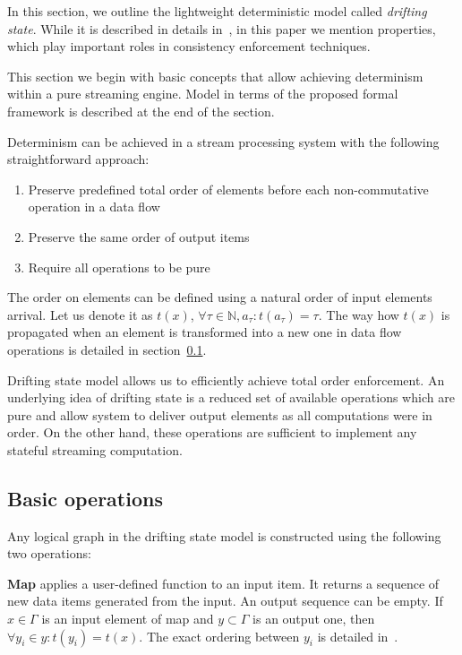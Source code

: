 
\label {fs-model-section}

In this section, we outline the lightweight deterministic model called {\em drifting state}. While it is described in details in~\cite{we2018adbis}, in this paper we mention properties, which play important roles in consistency enforcement techniques.

This section we begin with basic concepts that allow achieving determinism within a pure streaming engine. Model in terms of the proposed formal framework is described at the end of the section.

Determinism can be achieved in a stream processing system with the following straightforward approach:
\begin{enumerate}
    \item Preserve predefined total order of elements before each non-commutative operation in a data flow
    \item Preserve the same order of output items
    \item Require all operations to be pure
\end{enumerate}

The order on elements can be defined using a natural order of input elements arrival. Let us denote it as $t(x)$, $\forall \tau \in \mathbb{N}, a_\tau :  t(a_\tau)=\tau$. The way how $t(x)$ is propagated when an element is transformed into a new one in data flow operations is detailed in section~\ref{ops}.

Drifting state model allows us to efficiently achieve total order enforcement. An underlying idea of drifting state is a reduced set of available operations which are pure and allow system to deliver output elements as all computations were in order. On the other hand, these operations are sufficient to implement any stateful streaming computation.

\subsection{Basic operations}
\label{ops}

Any logical graph in the drifting state model is constructed using the following two operations:

{\bf Map} applies a user-defined function to an input item. It returns a sequence of new data items generated from the input. An output sequence can be empty. If $x\in \Gamma$ is an input element of map and $y\subset \Gamma$ is an output one, then $\forall y_i \in y : t(y_i)=t(x)$. The exact ordering between $y_i$ is detailed in~\cite{we2018adbis}.

